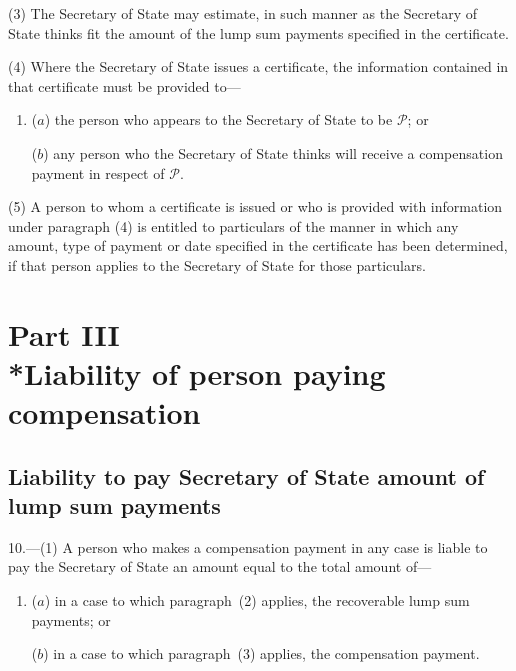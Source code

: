 \documentclass[12pt,a4paper]{article}
\begin{document}
(3) The Secretary of State may estimate, in such manner as the Secretary of State thinks fit the amount of the lump sum payments specified in the certificate.

(4) Where the Secretary of State issues a certificate, the information contained in that certificate must be provided to—
\begin{enumerate}\item[]
($a$) the person who appears to the Secretary of State to be $\mathcal{P}$; or

($b$) any person who the Secretary of State thinks will receive a compensation payment in respect of $\mathcal{P}$.
\end{enumerate}

(5) A person to whom a certificate is issued or who is provided with information under 
paragraph (4)  %
is entitled to particulars of the manner in which any amount, type of payment or date specified in the certificate has been determined, if that person applies to the Secretary of State for those particulars.


\section[Part III --- Liability of person paying compensation]{Part III\\*Liability of person paying compensation}

\renewcommand\parthead{--- Part III}

\subsection[10. Liability to pay Secretary of State amount of lump sum payments]{Liability to pay Secretary of State amount of lump sum payments}

10.---(1)  A person who makes a compensation payment in any case is liable to pay the Secretary of State an amount equal to the total amount of—
\begin{enumerate}\item[]
($a$) in a case to which paragraph~(2) applies, the recoverable lump sum payments; or

($b$) in a case to which paragraph~(3) applies, the compensation payment.
\end{enumerate}
\end{document}
